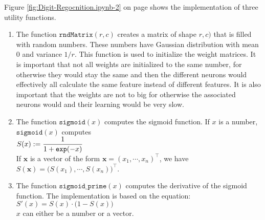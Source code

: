 Figure \ref{fig:Digit-Regocnition.ipynb-2} on page \pageref{fig:Digit-Regocnition.ipynb-2}
shows the implementation of three utility functions.
\begin{enumerate}
\item The function $\mathtt{rndMatrix}(r, c)$ creates a matrix of shape $r, c)$ that is filled with
      random numbers.  These numbers have Gaussian distribution with mean $0$ and variance
      $1/r$.  This function is used to initialize the weight matrices.  It is important that not all weights
      are initialized to the same number, for otherwise they would stay the same and then the different neurons
      would effectively all calculate the same feature instead of different features.  It is also important
      that the weights are not to big for otherwise the associated neurons would  and their
      learning would be very slow.
\item The function $\texttt{sigmoid}(x)$ computes the sigmoid function.  If $x$ is a number,
      $\texttt{sigmoid}(x)$ computes
      \\[0.2cm]
      \hspace*{1.3cm}
      $\displaystyle S(x) := \frac{1}{1 + \texttt{exp}(-x)}$
      \\[0.2cm]
      If $\mathbf{x}$ is a vector of the form $\mathbf{x} = (x_1,\cdots, x_n)^\top$, we have
      \\[0.2cm]
      \hspace*{1.3cm}
      $S(\mathbf{x}) = \bigl(S(x_1), \cdots, S(x_n)\bigr)^\top$.
\item The function $\texttt{sigmoid\_prime}(x)$ computes the derivative of the sigmoid function.
      The implementation is based on the equation:
      \\[0.2cm]
      \hspace*{1.3cm}
      $S'(x) = S(x) \cdot \bigl(1 - S(x)\bigr)$
      \\[0.2cm]
      $x$ can either be a number or a vector.
\end{enumerate}

